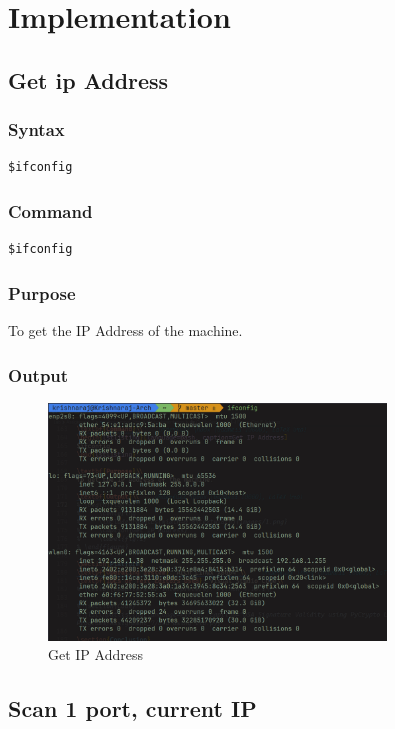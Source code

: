 \documentclass[11pt]{article}
\begin{document}
\section{Implementation}

\subsection{Get ip Address}

\subsubsection*{Syntax}
\begin{verbatim}
$ifconfig
\end{verbatim}

\subsubsection*{Command}
\begin{verbatim}
$ifconfig
\end{verbatim}

\subsubsection*{Purpose}
To get the IP Address of the machine.

\subsubsection*{Output}
\begin{figure}[H]
    \centering
    \includegraphics[width=0.8\textwidth]{ifconfig.png}
    \caption{Get IP Address}
    \label{fig:1}
\end{figure}

\subsection{Scan 1 port, current IP}
\end{document}
